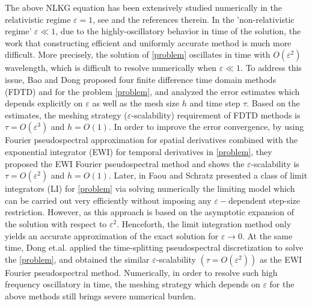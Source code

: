 \documentclass[final,leqno,showlabe]{siamltex}
\begin{document}
The above NLKG equation has been extensively studied numerically in the relativistic regime $\varepsilon=1$, see \cite{Bra:2009,Collocation:1993,Decomposition:1996,Radialbasis:2009,Symmplectic:1997,Jimenez:1990,Khalifa:2005,Legendre:1997,Finite:1995,Hermite:2018} and the references therein.
In the 'non-relativistic regime' $\varepsilon \ll 1$, due to the highly-oscillatory behavior in time of the solution, the work that constructing efficient and uniformly accurate method is much more difficult. More precisely, the solution of \eqref{problem} oscillates in time with $O(\varepsilon^2)$ wavelength,
which is difficult to resolve numerically when $\varepsilon\ll1$.
To address this issue, Bao and Dong \cite{finiteE:2012} proposed four finite difference time domain methods (FDTD) and for the problem \eqref{problem}, and analyzed the error estimates which depends explicitly on $\varepsilon$ as well as the mesh size $h$ and time step $\tau$. Based on the estimates, the meshing strategy ($\varepsilon$-scalability) requirement of FDTD methods is $\tau=O(\varepsilon^3)$ and $h=O(1)$.
In order to improve the error convergence, by using Fourier pseudospectral approximation for spatial derivatives combined with the exponential integrator (EWI) for temporal derivatives in \eqref{problem}, they proposed the EWI Fourier pseudospectral method and shows the $\varepsilon$-scalability is $\tau=O(\varepsilon^2)$ and $h=O(1)$.
Later, in \cite{Faou:2014} Faou and Schratz presented a class of limit integrators (LI) for \eqref{problem} via solving numerically the limiting model which can be carried out very efficiently without imposing any $\varepsilon-$dependent step-size restriction. However, as this approach is based on the asymptotic expansion of the solution with respect to $\varepsilon^2$. Henceforth, the limit integration method only yields an accurate approximation of the exact solution for $\varepsilon\rightarrow0$.
At the same time, Dong et.al. \cite{Timesplitting:2014} applied the time-splitting pseudospectral discretization to solve the \eqref{problem}, and obtained the similar $\varepsilon$-scalability $(\tau=O(\varepsilon^2))$ as the EWI Fourier pseudospectral method. Numerically, in order to resolve such high frequency oscillatory in time, the meshing strategy which depends on $\varepsilon$ for the above methods still brings severe numerical burden.
\end{document}
